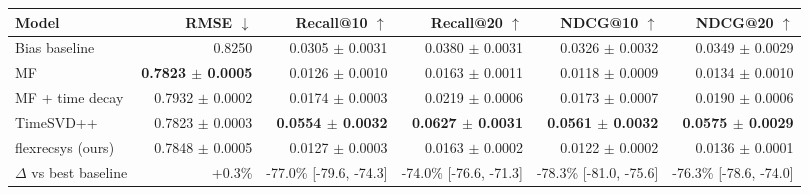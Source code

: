 \begin{tabular}{lrrrrr}
\toprule
Model & RMSE $\downarrow$ & Recall@10 $\uparrow$ & Recall@20 $\uparrow$ & NDCG@10 $\uparrow$ & NDCG@20 $\uparrow$ \\
\midrule
Bias baseline & 0.8250 & 0.0305 $\pm$ 0.0031 & 0.0380 $\pm$ 0.0031 & 0.0326 $\pm$ 0.0032 & 0.0349 $\pm$ 0.0029 \\
MF & \textbf{0.7823 $\pm$ 0.0005} & 0.0126 $\pm$ 0.0010 & 0.0163 $\pm$ 0.0011 & 0.0118 $\pm$ 0.0009 & 0.0134 $\pm$ 0.0010 \\
MF + time decay & 0.7932 $\pm$ 0.0002 & 0.0174 $\pm$ 0.0003 & 0.0219 $\pm$ 0.0006 & 0.0173 $\pm$ 0.0007 & 0.0190 $\pm$ 0.0006 \\
TimeSVD++ & 0.7823 $\pm$ 0.0003 & \textbf{0.0554 $\pm$ 0.0032} & \textbf{0.0627 $\pm$ 0.0031} & \textbf{0.0561 $\pm$ 0.0032} & \textbf{0.0575 $\pm$ 0.0029} \\
flexrecsys (ours) & 0.7848 $\pm$ 0.0005 & 0.0127 $\pm$ 0.0003 & 0.0163 $\pm$ 0.0002 & 0.0122 $\pm$ 0.0002 & 0.0136 $\pm$ 0.0001 \\
\midrule
$\Delta$ vs best baseline & +0.3\% & -77.0\% [-79.6, -74.3] & -74.0\% [-76.6, -71.3] & -78.3\% [-81.0, -75.6] & -76.3\% [-78.6, -74.0] \\
\bottomrule
\end{tabular}
